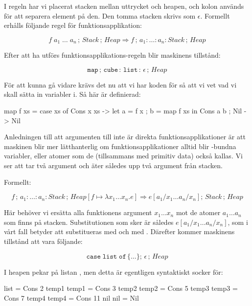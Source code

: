 \documentclass[../Core]{subfiles}
\begin{document}
I regeln har vi placerat stacken mellan uttrycket och heapen, och kolon används
för att separera element på den. Den tomma stacken skrivs som $\epsilon$.
Formellt erhålls följande regel för funktionsapplikation:

\[
f\; a_{1}\;\ldots\; a_{n}\,;\, Stack\,;\, Heap\Rightarrow f\,;\, a_{1}:\ldots:a_{n}:Stack\,;\, Heap\]


Efter att ha utförs funktionsapplikations-regeln blir maskinens tillstånd:

\[
\mathtt{map\,\mathrm{;}\, cube\,:\, list\,:\,\epsilon}\,;\, Heap\]

För att kunna gå vidare krävs det nu att vi har koden för  så att vi vet
vad vi skall sätta in variabler i. Så här är  definierad:


\begin{codeEx}
map f xs = case xs of
    { Cons x xs -> let { a = f x
                       ; b = map f xs
                       } in Cons a b
    ; Nil       -> Nil
    }
\end{codeEx}

Anledningen till att argumenten till  inte är direkta funktionsapplikationer
är att maskinen blir mer lätthanterlig om funktionsapplikationer alltid
blir -bundna variabler, eller atomer som de (tillsammans med primitiv data)
också kallas. Vi ser att  tar två argument och äter således upp två
argument från stacken.

Formellt:

\[
f\,;\, a_{1}:\ldots:a_{n}:Stack\,;\, Heap[f\mapsto\lambda x_{1}\ldots x_{n}.e]\Rightarrow e[a{}_{1}/x_{1}\ldots a_{n}/x_{n}];\, Stack\,;\, Heap\]


Här behöver vi ersätta alla funktionens argument $x_{1}\ldots x_{n}$ mot
de atomer $a_{1}\ldots a_{n}$ som finns på stacken. Substitutionen som sker är 
således $e[a{}_{1}/x_{1}\ldots a_{n}/x_{n}]$, som i vårt fall betyder att
 substitueras med  och  med . Därefter kommer maskinens tillstånd att vara följande:

\[
\mathtt{case\; list\; of\,\lbrace\ldots\rbrace};\,\epsilon\,;\, Heap\]


I heapen pekar  på listan \ic{[2,3,5,7,11]}, men detta är egentligen syntaktiskt socker
för:

\begin{codeEx}
list = Cons 2 temp1
temp1 = Cons 3 temp2
temp2 = Cons 5 temp3
temp3 = Cons 7 temp4
temp4 = Cons 11 nil
nil = Nil
\end{codeEx}
\end{document}
